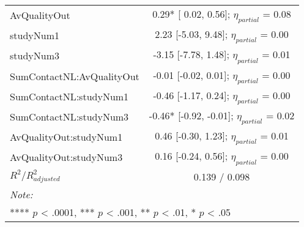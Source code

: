 \begin{landscape}
\begin{table}
\begin{minipage}[t][\textheight][t]{\textwidth}
{\begin{tabular}[t]{lcccccc}
\hspace{1em}AvQualityOut & \multicolumn{6}{c}{ 0.29* [ 0.02,  0.56]; $\eta_{partial}$ = 0.08}\\
\hspace{1em}studyNum1 & \multicolumn{6}{c}{ 2.23 [-5.03,  9.48]; $\eta_{partial}$ = 0.00}\\
\hspace{1em}studyNum3 & \multicolumn{6}{c}{-3.15 [-7.78,  1.48]; $\eta_{partial}$ = 0.01}\\
\hspace{1em}SumContactNL:AvQualityOut & \multicolumn{6}{c}{-0.01 [-0.02,  0.01]; $\eta_{partial}$ = 0.00}\\
\hspace{1em}SumContactNL:studyNum1 & \multicolumn{6}{c}{-0.46 [-1.17,  0.24]; $\eta_{partial}$ = 0.00}\\
\hspace{1em}SumContactNL:studyNum3 & \multicolumn{6}{c}{-0.46* [-0.92, -0.01]; $\eta_{partial}$ = 0.02}\\
\hspace{1em}AvQualityOut:studyNum1 & \multicolumn{6}{c}{ 0.46 [-0.30,  1.23]; $\eta_{partial}$ = 0.01}\\
\hspace{1em}AvQualityOut:studyNum3 & \multicolumn{6}{c}{ 0.16 [-0.24,  0.56]; $\eta_{partial}$ = 0.00}\\
\hspace{1em}$R^2 / R^2_{adjusted}$ & \multicolumn{6}{c}{0.139 / 0.098}\\
\bottomrule
\multicolumn{7}{l}{\rule{0pt}{1em}\textit{Note: }}\\
\multicolumn{7}{l}{\rule{0pt}{1em}**** $p$ < .0001, *** $p$ < .001, ** $p$ < .01, * $p$ < .05}\\
\end{tabular}}
\end{minipage}
\end{table}
\end{landscape}
